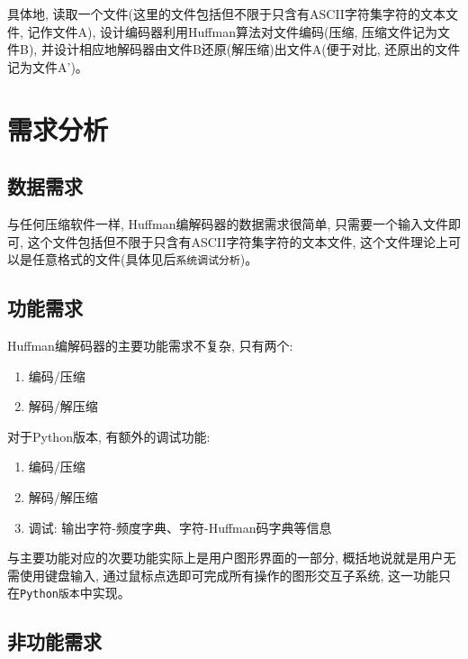 \documentclass[a4paper]{ctexart}
\begin{document}
具体地,
读取一个文件(这里的文件包括但不限于只含有ASCII字符集字符的文本文件, 记作文件A), 设计编码器利用Huffman算法对文件编码(压缩, 压缩文件记为文件B), 并设计相应地解码器由文件B还原(解压缩)出文件A(便于对比, 还原出的文件记为文件A')。


\section{需求分析}\label{header-n32}

\subsection{数据需求}\label{header-n33}

与任何压缩软件一样, Huffman编解码器的数据需求很简单, 只需要一个输入文件即可, 这个文件包括但不限于只含有ASCII字符集字符的文本文件, 这个文件理论上可以是任意格式的文件(具体见后\texttt{系统调试分析})。

\subsection{功能需求}\label{header-n35}

Huffman编解码器的主要功能需求不复杂, 只有两个:

\begin{enumerate}
\def\labelenumi{\arabic{enumi}.}
\item
  编码/压缩
\item
  解码/解压缩
\end{enumerate}

对于Python版本, 有额外的调试功能:

\begin{enumerate}
\def\labelenumi{\arabic{enumi}.}
\item
  编码/压缩
\item
  解码/解压缩
\item
  调试: 输出字符-频度字典、字符-Huffman码字典等信息
\end{enumerate}

与主要功能对应的次要功能实际上是用户图形界面的一部分, 概括地说就是用户无需使用键盘输入, 通过鼠标点选即可完成所有操作的图形交互子系统, 这一功能只在\texttt{Python版本}中实现。

\subsection{非功能需求}\label{header-n51}
\end{document}
